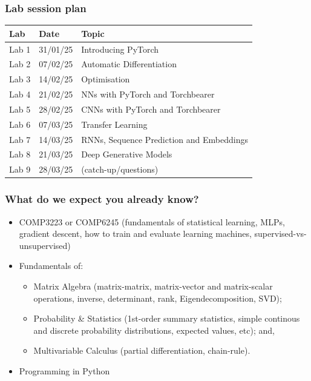 \documentclass[]{article}
\begin{document}
\begin{frame}
	\frametitle{Lab session plan}

	\begin{center}
	\begin{tabular}{ l l l }
		 Lab & Date & Topic \\ \hline
		 Lab 1  & 31/01/25 & Introducing PyTorch \\
		 Lab 2  & 07/02/25 & Automatic Differentiation \\
		 Lab 3  & 14/02/25 & Optimisation \\
		 Lab 4  & 21/02/25 & NNs with PyTorch and Torchbearer \\
 		 Lab 5  & 28/02/25 & CNNs with PyTorch and Torchbearer \\
 		 Lab 6  & 07/03/25 & Transfer Learning \\
 		 Lab 7  & 14/03/25 & RNNs, Sequence Prediction and Embeddings \\
     Lab 8  & 21/03/25 & Deep Generative Models\\
     Lab 9  & 28/03/25 & (catch-up/questions)\\
	\end{tabular}
	\end{center}
\end{frame}

\begin{frame}
	\frametitle{What do we expect you already know?}

	\begin{itemize}
	\item<+-> COMP3223 or COMP6245 (fundamentals of statistical learning, MLPs, gradient descent, how to train and evaluate learning machines, supervised-vs-unsupervised)
	\item<+-> Fundamentals of:
	\begin{itemize}
		\item Matrix Algebra (matrix-matrix, matrix-vector and matrix-scalar operations, inverse, determinant, rank, Eigendecomposition, SVD);
		\item Probability \& Statistics (1st-order summary statistics, simple continous and discrete probability distributions, expected values, etc); and,
		\item Multivariable Calculus (partial differentiation, chain-rule).
	\end{itemize}
	\item<+-> Programming in Python
	\end{itemize}
\end{frame}
\end{document}
